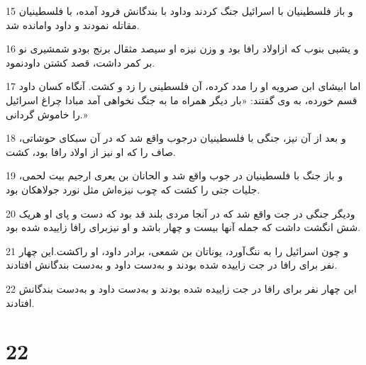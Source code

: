 \par 15 و باز فلسطینیان با اسرائیل جنگ کردند وداود با بندگانش فرود آمده، با فلسطینیان مقاتله نمودند و داود وامانده شد.
\par 16 و یشبی بنوب که ازاولاد رافا بود و وزن نیزه او سیصد مثقال برنج بودو شمشیری نو بر کمر داشت، قصد کشتن داودنمود.
\par 17 اما ابیشای ابن صرویه او را مدد کرده، آن فلسطینی را زد و کشت. آنگاه کسان داود قسم خورده، به وی گفتند: «بار دیگر همراه ما به جنگ نخواهی آمد مبادا چراغ اسرائیل را خاموش گردانی.»
\par 18 و بعد از آن نیز، جنگی با فلسطینیان درجوب واقع شد که در آن سبکای حوشاتی، صاف را که او نیز از اولاد رافا بود، کشت.
\par 19 و باز جنگ با فلسطینیان در جوب واقع شد و الحانان بن یعری ارجیم بیت لحمی، جلیات جتی را کشت که چوب نیزه‌اش مثل نورد جولاهکان بود.
\par 20 ودیگر جنگی در جت واقع شد که در آنجا مردی بلند قد بود که دست و پای او هریک شش انگشت داشت که جمله آنها بیست و چهار باشد و او نیزبرای رافا زاییده شده بود.
\par 21 و چون اسرائیل را به ننگ‌آورد، یوناتان بن شمعی، برادر داود، او راکشت.این چهار نفر برای رافا در جت زاییده شده بودند و به‌دست داود و به‌دست بندگانش افتادند.
\par 22 این چهار نفر برای رافا در جت زاییده شده بودند و به‌دست داود و به‌دست بندگانش افتادند.
 
\chapter{22}

